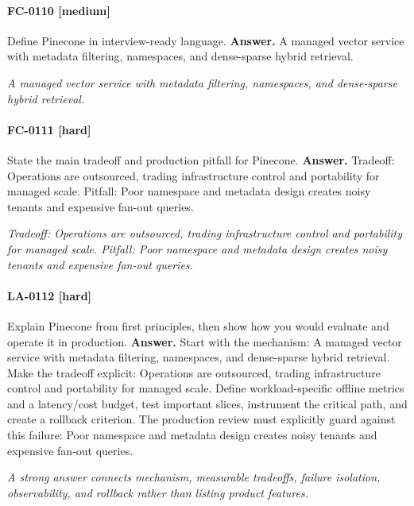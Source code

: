 \paragraph{FC-0110 [medium]} Define Pinecone in interview-ready language.
\noindent\textbf{Answer.} A managed vector service with metadata filtering, namespaces, and dense-sparse hybrid retrieval.
\par\textit{A managed vector service with metadata filtering, namespaces, and dense-sparse hybrid retrieval.}
\paragraph{FC-0111 [hard]} State the main tradeoff and production pitfall for Pinecone.
\noindent\textbf{Answer.} Tradeoff: Operations are outsourced, trading infrastructure control and portability for managed scale. Pitfall: Poor namespace and metadata design creates noisy tenants and expensive fan-out queries.
\par\textit{Tradeoff: Operations are outsourced, trading infrastructure control and portability for managed scale. Pitfall: Poor namespace and metadata design creates noisy tenants and expensive fan-out queries.}
\paragraph{LA-0112 [hard]} Explain Pinecone from first principles, then show how you would evaluate and operate it in production.
\noindent\textbf{Answer.} Start with the mechanism: A managed vector service with metadata filtering, namespaces, and dense-sparse hybrid retrieval. Make the tradeoff explicit: Operations are outsourced, trading infrastructure control and portability for managed scale. Define workload-specific offline metrics and a latency/cost budget, test important slices, instrument the critical path, and create a rollback criterion. The production review must explicitly guard against this failure: Poor namespace and metadata design creates noisy tenants and expensive fan-out queries.
\par\textit{A strong answer connects mechanism, measurable tradeoffs, failure isolation, observability, and rollback rather than listing product features.}
